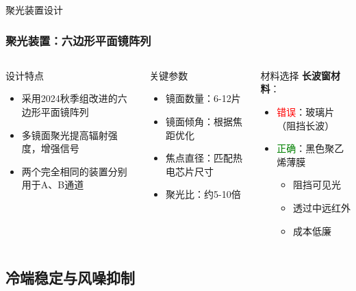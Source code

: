 \documentclass[aspectratio=169,11pt]{ctexbeamer}
\begin{document}
\begin{frame}{聚光装置设计}
\frametitle{聚光装置：六边形平面镜阵列}
\begin{columns}
\begin{block}{设计特点}
\begin{itemize}
    \item 采用2024秋季组改进的六边形平面镜阵列
    \item 多镜面聚光提高辐射强度，增强信号
    \item 两个完全相同的装置分别用于A、B通道
\end{itemize}
\end{block}

\begin{block}{关键参数}
\begin{itemize}
    \item 镜面数量：6-12片
    \item 镜面倾角：根据焦距优化
    \item 焦点直径：匹配热电芯片尺寸
    \item 聚光比：约5-10倍
\end{itemize}
\end{block}

\begin{block}{材料选择}
\textbf{长波窗材料}：
\begin{itemize}
    \item \textcolor{red}{错误}：玻璃片（阻挡长波）
    \item \textcolor{green}{正确}：黑色聚乙烯薄膜
    \begin{itemize}
        \item 阻挡可见光
        \item 透过中远红外
        \item 成本低廉
    \end{itemize}
\end{itemize}
\end{block}
\end{columns}
\end{frame}

\subsection{冷端稳定与风噪抑制}
\end{document}
